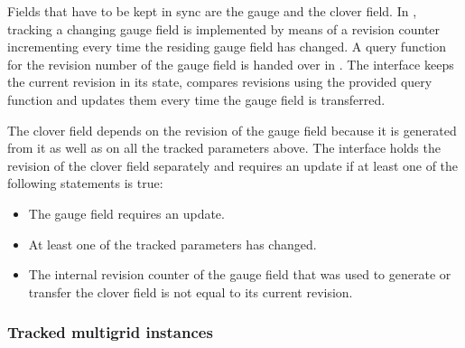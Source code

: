 Fields that have to be kept in sync are the gauge and the clover field.
In \openqxd, tracking a changing gauge field is implemented by means of a revision counter incrementing every time the residing gauge field has changed.
A query function for the revision number of the gauge field is handed over in .
The interface keeps the current revision in its state, compares revisions using the provided query function and updates them every time the gauge field is transferred.

The clover field depends on the revision of the gauge field because it is generated from it as well as on all the tracked parameters above.
The interface holds the revision of the clover field separately and requires an update if at least one of the following statements is true:
\begin{itemize}
  \item The gauge field requires an update.
  \item At least one of the tracked parameters has changed.
  \item The internal revision counter of the gauge field that was used to generate or transfer the clover field is not equal to its current revision.
\end{itemize}

\subsubsection{Tracked multigrid instances}

